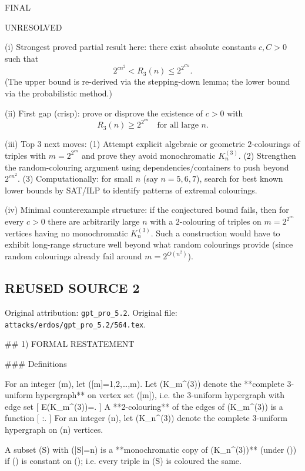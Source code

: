FINAL

UNRESOLVED

(i) Strongest proved partial result here: there exist absolute constants $c,C>0$ such that
\[
2^{c n^2} < R_3(n) \le 2^{2^{C n}}.
\]
(The upper bound is re-derived via the stepping-down lemma; the lower bound via the probabilistic method.)

(ii) First gap (crisp): prove or disprove the existence of $c>0$ with
\[
R_3(n) \ge 2^{2^{c n}} \quad\text{for all large }n.
\]

(iii) Top 3 next moves:
(1) Attempt explicit algebraic or geometric $2$-colourings of triples with $m=2^{2^{c n}}$ and prove they avoid monochromatic $K_n^{(3)}$.
(2) Strengthen the random-colouring argument using dependencies/containers to push beyond $2^{c n^2}$.
(3) Computationally: for small $n$ (say $n=5,6,7$), search for best known lower bounds by SAT/ILP to identify patterns of extremal colourings.

(iv) Minimal counterexample structure: if the conjectured bound fails, then for every $c>0$ there are arbitrarily large $n$ with a $2$-colouring of triples on $m=2^{2^{c n}}$ vertices having no monochromatic $K_n^{(3)}$.
Such a construction would have to exhibit long-range structure well beyond what random colourings provide (since random colourings already fail around $m=2^{O(n^2)}$).




\subsection*{REUSED SOURCE 2}
Original attribution: \texttt{gpt\_pro\_5.2}.
Original file: \texttt{attacks/erdos/gpt\_pro\_5.2/564.tex}.

## 1) FORMAL RESTATEMENT

### Definitions

For an integer (m), let ([m]={1,2,\dots,m}).
Let (K_m^{(3)}) denote the **complete 3-uniform hypergraph** on vertex set ([m]), i.e. the 3-uniform hypergraph with edge set
[
E(K_m^{(3)})=.
]
A **2-colouring** of the edges of (K_m^{(3)}) is a function
[
\chi:.
]
For an integer (n), let (K_n^{(3)}) denote the complete 3-uniform hypergraph on (n) vertices.

A subset (S\subseteq [m]) with (|S|=n) is a **monochromatic copy of (K_n^{(3)})** (under (\chi)) if (\chi) is constant on (); i.e. every triple in (S) is coloured the same.

